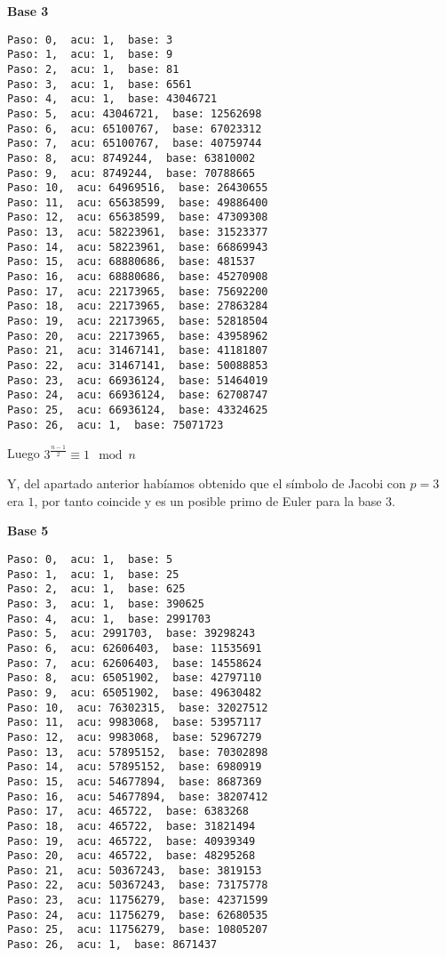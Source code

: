 \documentclass[a4paper]{article}
\begin{document}
\textbf{Base 3}
\begin{verbatim}
Paso: 0,  acu: 1,  base: 3  
Paso: 1,  acu: 1,  base: 9  
Paso: 2,  acu: 1,  base: 81  
Paso: 3,  acu: 1,  base: 6561  
Paso: 4,  acu: 1,  base: 43046721  
Paso: 5,  acu: 43046721,  base: 12562698  
Paso: 6,  acu: 65100767,  base: 67023312  
Paso: 7,  acu: 65100767,  base: 40759744  
Paso: 8,  acu: 8749244,  base: 63810002  
Paso: 9,  acu: 8749244,  base: 70788665  
Paso: 10,  acu: 64969516,  base: 26430655  
Paso: 11,  acu: 65638599,  base: 49886400  
Paso: 12,  acu: 65638599,  base: 47309308  
Paso: 13,  acu: 58223961,  base: 31523377  
Paso: 14,  acu: 58223961,  base: 66869943  
Paso: 15,  acu: 68880686,  base: 481537  
Paso: 16,  acu: 68880686,  base: 45270908  
Paso: 17,  acu: 22173965,  base: 75692200  
Paso: 18,  acu: 22173965,  base: 27863284  
Paso: 19,  acu: 22173965,  base: 52818504  
Paso: 20,  acu: 22173965,  base: 43958962  
Paso: 21,  acu: 31467141,  base: 41181807  
Paso: 22,  acu: 31467141,  base: 50088853  
Paso: 23,  acu: 66936124,  base: 51464019  
Paso: 24,  acu: 66936124,  base: 62708747  
Paso: 25,  acu: 66936124,  base: 43324625  
Paso: 26,  acu: 1,  base: 75071723 
\end{verbatim}

Luego $3^{\frac{n-1}{2}}\equiv 1\mod n$

Y, del apartado anterior habíamos obtenido que el símbolo de Jacobi con $p=3$ era $1$, por tanto coincide y es un posible primo de Euler para la base $3$.

\textbf{Base 5}
\begin{verbatim}
Paso: 0,  acu: 1,  base: 5  
Paso: 1,  acu: 1,  base: 25  
Paso: 2,  acu: 1,  base: 625  
Paso: 3,  acu: 1,  base: 390625  
Paso: 4,  acu: 1,  base: 2991703  
Paso: 5,  acu: 2991703,  base: 39298243  
Paso: 6,  acu: 62606403,  base: 11535691  
Paso: 7,  acu: 62606403,  base: 14558624  
Paso: 8,  acu: 65051902,  base: 42797110  
Paso: 9,  acu: 65051902,  base: 49630482  
Paso: 10,  acu: 76302315,  base: 32027512  
Paso: 11,  acu: 9983068,  base: 53957117  
Paso: 12,  acu: 9983068,  base: 52967279  
Paso: 13,  acu: 57895152,  base: 70302898  
Paso: 14,  acu: 57895152,  base: 6980919  
Paso: 15,  acu: 54677894,  base: 8687369  
Paso: 16,  acu: 54677894,  base: 38207412  
Paso: 17,  acu: 465722,  base: 6383268  
Paso: 18,  acu: 465722,  base: 31821494  
Paso: 19,  acu: 465722,  base: 40939349  
Paso: 20,  acu: 465722,  base: 48295268  
Paso: 21,  acu: 50367243,  base: 3819153  
Paso: 22,  acu: 50367243,  base: 73175778  
Paso: 23,  acu: 11756279,  base: 42371599  
Paso: 24,  acu: 11756279,  base: 62680535  
Paso: 25,  acu: 11756279,  base: 10805207  
Paso: 26,  acu: 1,  base: 8671437  
\end{verbatim}
\end{document}
